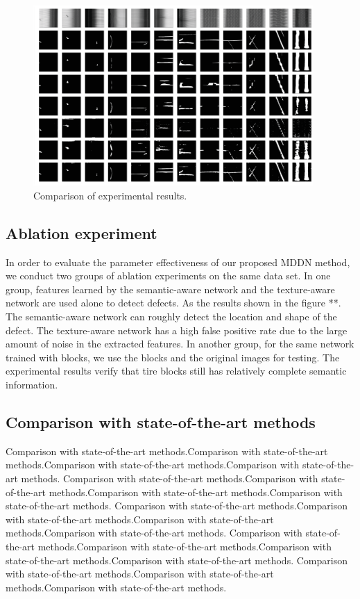 \documentclass{article}
\begin{document}
\begin{figure}[t]
  \centering
  \centerline{\includegraphics[width=0.95\textwidth]{pic3.eps}}
  \caption{Comparison of experimental results.}
\end{figure}

\subsection{Ablation experiment}
\label{Ablation experiment}
In order to evaluate the parameter effectiveness of our proposed MDDN method, we conduct two groups of ablation experiments on the same data set. In one group, features learned by the semantic-aware network and the texture-aware network are used alone to detect defects. As the results shown in the figure **. The semantic-aware network can roughly detect the location and shape of the defect. The texture-aware network has a high false positive rate due to the large amount of noise in the extracted features. In another group, for the same network trained with blocks, we use the blocks and the original images for testing. The experimental results verify that tire blocks still has relatively complete semantic information.

\subsection{Comparison with state-of-the-art methods}
\label{state-of-the-art methods}
Comparison with state-of-the-art methods.Comparison with state-of-the-art methods.Comparison with state-of-the-art methods.Comparison with state-of-the-art methods.
Comparison with state-of-the-art methods.Comparison with state-of-the-art methods.Comparison with state-of-the-art methods.Comparison with state-of-the-art methods.
Comparison with state-of-the-art methods.Comparison with state-of-the-art methods.Comparison with state-of-the-art methods.Comparison with state-of-the-art methods.
Comparison with state-of-the-art methods.Comparison with state-of-the-art methods.Comparison with state-of-the-art methods.Comparison with state-of-the-art methods.
Comparison with state-of-the-art methods.Comparison with state-of-the-art methods.Comparison with state-of-the-art methods.
\end{document}
